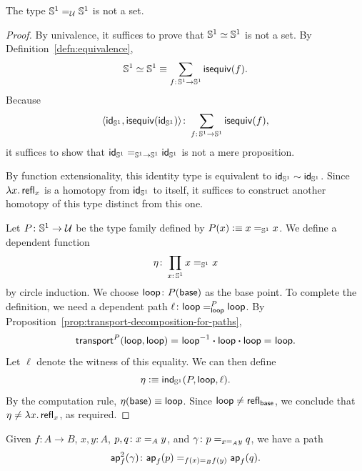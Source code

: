 \begin{cor}
    The type\/ $\mathbb S^1\mathrel{=_{\mathcal U}}\mathbb S^1$ is not a set.
\end{cor}

\begin{proof}
    By univalence, it suffices to prove that $\mathbb S^1\simeq\mathbb S^1$ is not a set. By Definition~\ref{defn:equivalence},
    \[
        \sphere^1\simeq\sphere^1\equiv
            \sum_{f\colon\sphere^1\to\sphere^1}
                \fun{isequiv}(f).
    \]
    Because
    \[
        \dep{
            \id_{\sphere^1},
            \fun{isequiv}(\id_{\sphere^1})
        }
            \colon\sum_{f\colon\sphere^1\to\sphere^1}
                \fun{isequiv}(f),
    \]
    it suffices to show that $\mathsf{id}_{\mathbb S^1}\mathrel{=_{\mathbb S^1\to\mathbb S^1}}\mathsf{id}_{\mathbb S^1}$ is not a mere proposition.

    By function extensionality, this identity type is equivalent to $\mathsf{id}_{\mathbb S^1}\sim\mathsf{id}_{\mathbb S^1}$. Since $\lambda x.\,\mathsf{refl}_x$ is a homotopy from $\mathsf{id}_{\mathbb S^1}$ to itself, it suffices to construct another homotopy of this type distinct from this one.

    Let $P\colon\sphere^1\to\univ$ be the type family defined by $P(x)\mathrel{\vcentcolon}\equiv x\mathrel{=_{\mathbb S^1}}x$. We define a dependent function
    \[
        \eta\colon\prod_{x\colon\sphere^1}x\eq{\sphere^1}x
    \]
    by circle induction. We choose $\fun{loop}\colon P(\fun{base})$ as the base point. To complete the definition, we need a dependent path $\ell\colon\fun{loop}\eqt{\fun{loop}}P\fun{loop}$. By Proposition~\ref{prop:transport-decomposition-for-paths},
    \[
        \mathsf{transport}^P(\mathsf{loop},\mathsf{loop})
        \mathrel{=_{}} \mathsf{loop}^{-1}\mathbin{\boldsymbol{\cdot}}\mathsf{loop}\mathbin{\boldsymbol{\cdot}}\mathsf{loop}
        \mathrel{=_{}} \mathsf{loop}.
    \]
    Let $\ell$ denote the witness of this equality. We can then define
    \[
        \eta\mathrel{\vcentcolon}\equiv\mathsf{ind}_{\mathbb S^1}
            (
                P,
                \mathsf{loop},
                \ell
            ).
    \]
    By the computation rule, $\eta(\mathsf{base})\equiv\mathsf{loop}$. Since $\mathsf{loop}\ne\mathsf{refl}_{\mathsf{base}}$, we conclude that $\eta\ne\lambda x.\,\mathsf{refl}_x$, as required.
\end{proof}

\begin{lem}
    Given\/ $f\colon A\to B$,\/ $x,y\colon A$,\/ $p,q\colon x\eq{A}y$, and\/ $\gamma\colon p\eq{x\eq{A}y}q$, we have a path
    \[
        \fun{ap}^2_f(\gamma)\colon\fun{ap}_f(p)\eq{f(x)\eq{B}f(y)}\fun{ap}_f(q).
    \]
\end{lem}

